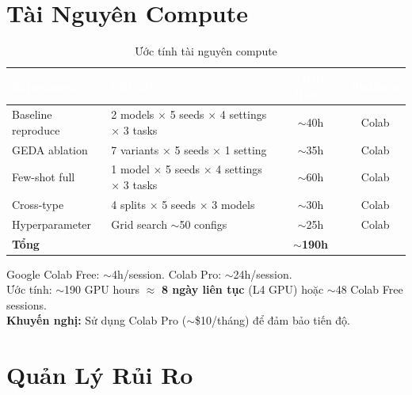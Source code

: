\documentclass[12pt,a4paper]{article}
\begin{document}
\section{Tài Nguyên Compute}

\begin{table}[H]
\centering
\caption{Ước tính tài nguyên compute}
\begin{tabularx}{\textwidth}{l X c c}
\toprule
\rowcolor{tableheader}
\textcolor{white}{\textbf{Experiment}} & \textcolor{white}{\textbf{Chi tiết}} & \textcolor{white}{\textbf{GPU Hours}} & \textcolor{white}{\textbf{Platform}} \\
\midrule
Baseline reproduce & 2 models $\times$ 5 seeds $\times$ 4 settings $\times$ 3 tasks & $\sim$40h & Colab \\
GEDA ablation & 7 variants $\times$ 5 seeds $\times$ 1 setting & $\sim$35h & Colab \\
Few-shot full & 1 model $\times$ 5 seeds $\times$ 4 settings $\times$ 3 tasks & $\sim$60h & Colab \\
Cross-type & 4 splits $\times$ 5 seeds $\times$ 3 models & $\sim$30h & Colab \\
Hyperparameter & Grid search $\sim$50 configs & $\sim$25h & Colab \\
\midrule
\textbf{Tổng} & & \textbf{$\sim$190h} & \\
\bottomrule
\end{tabularx}
\end{table}

\begin{riskbox}
Google Colab Free: $\sim$4h/session. Colab Pro: $\sim$24h/session.\\
Ước tính: $\sim$190 GPU hours $\approx$ \textbf{8 ngày liên tục} (L4 GPU) hoặc $\sim$48 Colab Free sessions.\\
\textbf{Khuyến nghị:} Sử dụng Colab Pro ($\sim$\$10/tháng) để đảm bảo tiến độ.
\end{riskbox}

\section{Quản Lý Rủi Ro}
\end{document}

